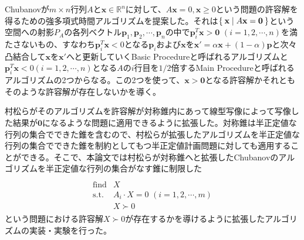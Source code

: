 Chubanovが$m \times n$行列$A$と$\mathbf{x} \in \mathbb{R}^n$に対して、$A \mathbf{x} = 0, \mathbf{x} \geq 0$という問題の許容解を得るための強多項式時間アルゴリズムを提案した\cite{Chubanov}。それは$\Set{\mathbf{x} | A \mathbf{x} = \mathbf{0}}$という空間への射影$P_A$の各列ベクトル$\mathbf{p}_1, \mathbf{p}_2, \cdots, \mathbf{p}_n$の中で$\mathbf{p}_i^T \mathbf{x} > \mathbf{0} \,\, (i = 1, 2, \cdots, n)$を満たさないもの、すなわち$\mathbf{p}_i^T \mathbf{x} < 0$となる$\mathbf{p}_i$および$\mathbf{x}$を$\mathbf{x}' = \alpha \mathbf{x} + (1 - \alpha) \mathbf{p}$と次々凸結合して$\mathbf{x}$を$\mathbf{x}'$へと更新していくBasic Procedureと呼ばれるアルゴリズムと$\mathbf{p}_i^T \mathbf{x} < 0 (i = 1, 2, \cdots, n)$となる$A$の$i$行目を$1 / 2$倍するMain Procedureと呼ばれるアルゴリズムの2つからなる。この2つを使って、$\mathbf{x} > \mathbf{0}$となる許容解かそれともそのような許容解が存在しないかを導く。

村松らがそのアルゴリズムを許容解が対称錐内にあって線型写像によって写像した結果が$\mathbf{0}$になるような問題に適用できるように拡張した\cite{SymmetricCone}。対称錐は半正定値な行列の集合でできた錐を含むので、村松らが拡張したアルゴリズムを半正定値な行列の集合でできた錐を制約としてもつ半正定値計画問題に対しても適用することができる。そこで、本論文では村松らが対称錐へと拡張したChubanovのアルゴリズムを半正定値な行列の集合がなす錐に制限した
\begin{align} \label{SemidefiniteSystem}
  \begin{array}{ll} \\
    \text{find} & X \\
    \text{s.t.} & A_i \cdot X = 0 \,\, (i = 1, 2, \cdots, m) \\
                & X \succ 0
  \end{array}
\end{align}
という問題における許容解$X \succ 0$が存在するかを導けるように拡張したアルゴリズムの実装・実験を行った。
